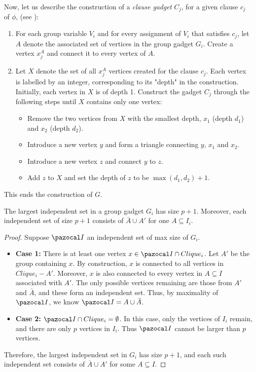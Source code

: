 Now, let us describe the construction of a \textit{clause gadget} $C_j$, for a given clause $c_j$ of $\phi$, (see ):
\begin{enumerate}
    \item For each group variable $V_i$ and for every assignment of $V_i$ that satisfies $c_j$, let $A$ denote the associated set of vertices in the group gadget $G_i$. Create a vertex $x_j^A$ and connect it to every vertex of $A$.
    \item Let $X$ denote the set of all $x_j^A$ vertices created for the clause $c_j$. Each vertex is labelled by an integer, corresponding to its "depth" in the construction. Initially, each vertex in $X$ is of depth 1. Construct the gadget $C_j$ through the following steps until $X$ contains only one vertex:
    \begin{itemize}
        \item Remove the two vertices from $X$ with the smallest depth, $x_1$ (depth $d_1$) and $x_2$ (depth $d_2$).
        \item Introduce a new vertex $y$ and form a triangle connecting $y$, $x_1$ and $x_2$.
        \item Introduce a new vertex $z$ and connect $y$ to $z$.
        \item Add $z$ to $X$ and set the depth of $z$ to be $\max(d_1, d_2) + 1$. 
    \end{itemize}
\end{enumerate}

\medskip

This ends the construction of $G$.

\begin{lemma}
    \label{lemma:group-gadget-indset}
    The largest independent set in a group gadget $G_i$ has size $p+1$. Moreover, each independent set of size $p+1$ consists of $\bar{A} \cup A'$ for one $A \subseteq I_i$.
\end{lemma}

\begin{proof}
    Suppose $\I$ an independent set of max size of $G_i$.
    \begin{itemize}
        \item \textbf{Case 1:} There is at least one vertex $x \in \I \cap Clique_i$. Let $A'$ be the group containing $x$. By construction, $x$ is connected to all vertices in $Clique_i - A'$. Moreover, $x$ is also connected to every vertex in $A \subseteq I$ associated with $A'$. The only possible vertices remaining are those from $A'$ and $\bar{A}$, and these form an independent set. Thus, by maximality of $\I$, we know $\I = A \cup \bar{A}$.
        \item \textbf{Case 2:} $\I \cap Clique_i = \emptyset$. In this case, only the vertices of $I_i$ remain, and there are only $p$ vertices in $I_i$. Thus $\I$ cannot be larger than $p$ vertices.
    \end{itemize}

    \medskip

    Therefore, the largest independent set in $G_i$ has size $p+1$, and each such independent set consists of $\bar{A} \cup A'$ for some $A \subseteq I$.
\end{proof}

